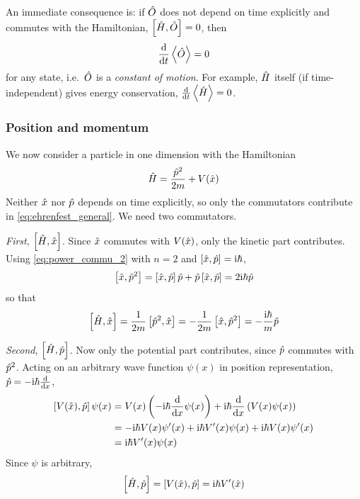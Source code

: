 An immediate consequence is: if $\hat{O}$ does not depend on time explicitly and commutes with the Hamiltonian, $\left[ \hat{H} , \hat{O} \right] = 0$, then
\begin{align*}
    \frac{\mathrm{d}}{\mathrm{d} t} \left\langle \hat{O} \right\rangle = 0
\end{align*}
for any state, i.e.\ $\hat{O}$ is a \emph{constant of motion}. For example, $\hat{H}$ itself (if time-independent) gives energy conservation, $\frac{\mathrm{d}}{\mathrm{d} t}\left\langle \hat{H} \right\rangle = 0$.

\subsubsection{Position and momentum}
We now consider a particle in one dimension with the Hamiltonian
\begin{align*}
    \hat{H} = \frac{\hat{p}^2}{2m} + V(\hat{x})
\end{align*}
Neither $\hat{x}$ nor $\hat{p}$ depends on time explicitly, so only the commutators contribute in \cref{eq:ehrenfest_general}. We need two commutators.

\emph{First}, $\left[ \hat{H} , \hat{x} \right]$. Since $\hat{x}$ commutes with $V(\hat{x})$, only the kinetic part contributes. Using \cref{eq:power_commu_2} with $n = 2$ and $\left[ \hat{x} , \hat{p} \right] = \mathrm{i} \hbar$,
\begin{align*}
    \left[ \hat{x} , \hat{p}^2 \right] = \left[ \hat{x} , \hat{p} \right]\hat{p} + \hat{p}\left[ \hat{x} , \hat{p} \right] = 2 \mathrm{i} \hbar \hat{p}
\end{align*}
so that
\begin{align*}
    \left[ \hat{H} , \hat{x} \right] = \frac{1}{2m} \left[ \hat{p}^2 , \hat{x} \right] = - \frac{1}{2m} \left[ \hat{x} , \hat{p}^2 \right] = - \frac{\mathrm{i} \hbar}{m} \hat{p}
\end{align*}

\emph{Second}, $\left[ \hat{H} , \hat{p} \right]$. Now only the potential part contributes, since $\hat{p}$ commutes with $\hat{p}^2$. Acting on an arbitrary wave function $\psi(x)$ in position representation, $\hat{p} = - \mathrm{i} \hbar \frac{\mathrm{d}}{\mathrm{d} x}$,
\begin{align*}
    \left[ V(\hat{x}) , \hat{p} \right] \psi(x) &= V(x) \left( - \mathrm{i} \hbar \frac{\mathrm{d}}{\mathrm{d} x} \psi(x) \right) + \mathrm{i} \hbar \frac{\mathrm{d}}{\mathrm{d} x} \left( V(x) \psi(x) \right) \\
    &= - \mathrm{i} \hbar V(x) \psi'(x) + \mathrm{i} \hbar V'(x) \psi(x) + \mathrm{i} \hbar V(x) \psi'(x) \\
    &= \mathrm{i} \hbar V'(x) \psi(x)
\end{align*}
Since $\psi$ is arbitrary,
\begin{align*}
    \left[ \hat{H} , \hat{p} \right] = \left[ V(\hat{x}) , \hat{p} \right] = \mathrm{i} \hbar V'(\hat{x})
\end{align*}

